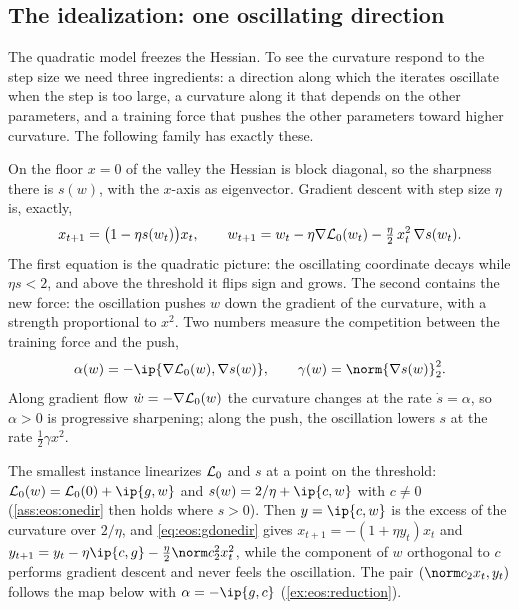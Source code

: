 \begin{refsection}
\section{The idealization: one oscillating direction}\label{sec:eos:ideal}

The quadratic model freezes the Hessian. To see the curvature respond to the step size we need three ingredients: a direction along which the iterates oscillate when the step is too large, a curvature along it that depends on the other parameters, and a training force that pushes the other parameters toward higher curvature. The following family has exactly these.


On the floor $x=0$ of the valley the Hessian is block diagonal, so the sharpness there is $s(w)$, with the $x$-axis as eigenvector. Gradient descent with step size $\eta$ is, exactly,
\begin{equation}\label{eq:eos:gdonedir}
  x_{t+1}=\bigl(1-\eta s(w_t)\bigr)x_t,\qquad
  w_{t+1}=w_t-\eta\nabla\mathcal{L}_0(w_t)-\tfrac\eta2\,x_t^2\,\nabla s(w_t).
\end{equation}
The first equation is the quadratic picture: the oscillating coordinate decays while $\eta s<2$, and above the threshold it flips sign and grows. The second contains the new force: the oscillation pushes $w$ down the gradient of the curvature, with a strength proportional to $x^2$. Two numbers measure the competition between the training force and the push,
\begin{equation}\label{eq:eos:alphagamma}
  \alpha(w)=-\ip{\nabla\Loss_0(w),\nabla s(w)},\qquad \gamma(w)=\norm{\nabla s(w)}_2^2 .
\end{equation}
Along gradient flow $\dot w=-\nabla\mathcal{L}_0(w)$ the curvature changes at the rate $\dot s=\alpha$, so $\alpha>0$ is progressive sharpening; along the push, the oscillation lowers $s$ at the rate $\frac12\gamma x^2$.

The smallest instance linearizes $\mathcal{L}_0$ and $s$ at a point on the threshold: $\Loss_0(w)=\Loss_0(0)+\ip{g,w}$ and $s(w)=2/\eta+\ip{c,w}$ with $c\ne0$ (\cref{ass:eos:onedir} then holds where $s>0$). Then $y=\ip{c,w}$ is the excess of the curvature over $2/\eta$, and \eqref{eq:eos:gdonedir} gives $x_{t+1}=-(1+\eta y_t)x_t$ and $y_{t+1}=y_t-\eta\ip{c,g}-\frac\eta2\norm c_2^2x_t^2$, while the component of $w$ orthogonal to $c$ performs gradient descent and never feels the oscillation. The pair $(\norm c_2x_t,y_t)$ follows the map below with $\alpha=-\ip{g,c}$ (\cref{ex:eos:reduction}).


\end{refsection}
